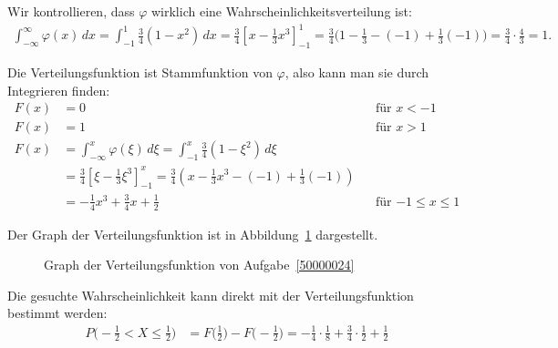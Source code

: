 \begin{loesung}
Wir kontrollieren, dass $\varphi$ wirklich eine Wahrscheinlichkeitsverteilung
ist:
\begin{align*}
\int_{-\infty}^{\infty}\varphi(x)\,dx
=
\int_{-1}^1 \frac34(1-x^2)\,dx
=
\frac34\left[
x-\frac13x^3
\right]_{-1}^1
=
\frac34\biggl(1-\frac13-(-1)+\frac13(-1)\biggr)
=
\frac34\cdot\frac43
=1.
\end{align*}
\begin{teilaufgaben}
\item Die Verteilungsfunktion ist Stammfunktion von $\varphi$, also kann man sie
durch Integrieren finden:
\begin{align*}
F(x)&=0&&\text{für $x < -1$}\\
F(x)&=1&&\text{für $x > 1$}\\
F(x)&=\int_{-\infty}^x\varphi(\xi)\,d\xi =\int_{-1}^x\frac34(1-\xi^2)\,d\xi
\\
&=
\frac34\left[
\xi -\frac13\xi^3
\right]_{-1}^x
=\frac34(x-\frac13x^3-(-1)+\frac13(-1))
\\
&=-\frac14x^3+\frac34x+\frac12&&\text{für $-1\le x\le 1$}
\end{align*}
\item Der Graph der Verteilungsfunktion ist in
Abbildung~\ref{50000024:verteilungsfunktion} dargestellt.
\begin{figure}
\centering
\def\h{2.5}
\caption{Graph der Verteilungsfunktion von Aufgabe~\ref{50000024}
\label{50000024:verteilungsfunktion}}
\end{figure}
\item Die gesuchte Wahrscheinlichkeit kann direkt mit der Verteilungsfunktion
bestimmt werden:
\begin{align*}
P\biggl(-\frac12<X\le \frac12\biggr)
&=
F\biggl(\frac12\biggr)-F\biggl(-\frac12\biggr)
=
-\frac14\cdot\frac18+\frac34\cdot\frac12+\frac12

\end{align*}
\end{teilaufgaben}
\end{loesung}
